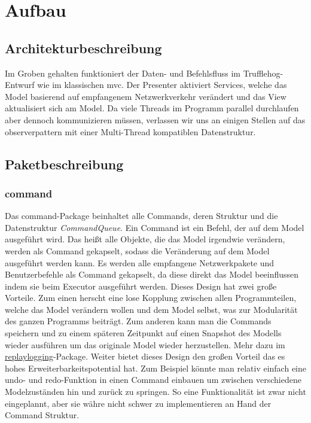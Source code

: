 \chapter{Aufbau \programname}

\section{Architekturbeschreibung}
Im Groben gehalten funktioniert der Daten- und Befehlsfluss im Trufflehog-Entwurf
wie im klassischen \gls{mvc}. Der Presenter aktiviert Services, welche das Model basierend
auf empfangenem Netzwerkverkehr verändert und das View aktualisiert sich am Model.
Da viele Threads im Programm parallel durchlaufen aber dennoch kommunizieren müssen,
verlassen wir uns an einigen Stellen auf das \gls{observerpattern} mit einer
Multi-Thread kompatiblen Datenstruktur.\newline
\newline

\section{Paketbeschreibung}

\subsection{command}
\label{subsec:command}
Das command-Package beinhaltet alle Commands, deren Struktur und die Datenstruktur
\textit{CommandQueue}. Ein Command ist ein Befehl, der auf
dem Model ausgeführt wird. Das heißt alle Objekte, die das Model irgendwie verändern,
werden als Command gekapselt, sodass die Veränderung auf dem Model
ausgeführt werden kann. Es werden alle empfangene Netzwerkpakete
und Benutzerbefehle als Command gekapselt, da diese direkt das Model beeinflussen
indem sie beim Executor ausgeführt werden.
\newline
\newline
Dieses Design hat zwei große Vorteile. Zum einen herscht eine lose Kopplung zwischen
allen Programmteilen, welche das Model verändern wollen und dem Model selbst, was zur Modularität des ganzen
Programms beiträgt. Zum anderen kann man die Commands speichern und zu einem
späteren Zeitpunkt auf einen Snapshot des Modells wieder ausführen um das originale
Model wieder herzustellen. Mehr dazu im
\hyperref[subsubsec:replaylogging]{replaylogging}-Package. Weiter bietet dieses
Design den großen Vorteil das es hohes Erweiterbarkeitspotential hat. Zum Beispiel
könnte man relativ einfach eine undo- und redo-Funktion in einen Command einbauen um
zwischen verschiedene Modelzuständen hin und zurück zu springen. So eine
Funktionalität ist zwar nicht eingeplannt, aber sie währe nicht schwer zu implementieren
an Hand der Command Struktur.
\newline
\newline

